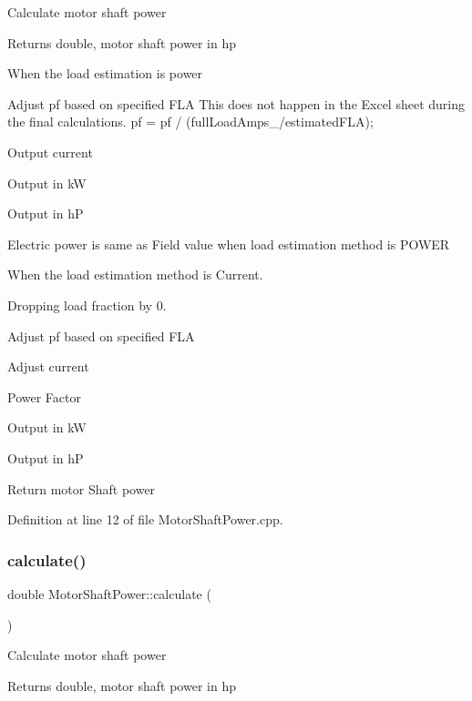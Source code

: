 Calculate motor shaft power

\begin{DoxyReturn}{Returns}
double, motor shaft power in hp 
\end{DoxyReturn}
When the load estimation is power

Adjust pf based on specified F\+LA This does not happen in the Excel sheet during the final calculations. pf = pf / (full\+Load\+Amps\+\_\+/estimated\+F\+LA);

Output current

Output in kW

Output in hP

Electric power is same as Field value when load estimation method is P\+O\+W\+ER

When the load estimation method is Current.

Dropping load fraction by 0.

Adjust pf based on specified F\+LA

Adjust current

Power Factor

Output in kW

Output in hP

Return motor Shaft power 

Definition at line 12 of file Motor\+Shaft\+Power.\+cpp.

\mbox{\label{class_motor_shaft_power_a65fc4f52753011c5a49376bc79bf81bc}} 
\subsubsection{\texorpdfstring{calculate()}{calculate()}\hspace{0.1cm}{\footnotesize\ttfamily [2/3]}}
{\footnotesize\ttfamily double Motor\+Shaft\+Power\+::calculate (\begin{DoxyParamCaption}{ }\end{DoxyParamCaption})}

Calculate motor shaft power

\begin{DoxyReturn}{Returns}
double, motor shaft power in hp 
\end{DoxyReturn}
\mbox{\label{class_motor_shaft_power_a65fc4f52753011c5a49376bc79bf81bc}} 
